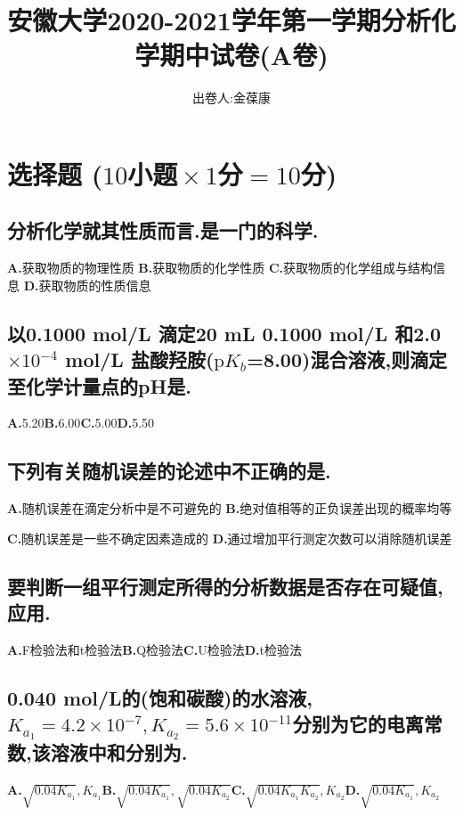 \documentclass[UTF8]{article}
\title{安徽大学2020-2021学年第一学期分析化学期中试卷(A卷)}
\author{出卷人:金葆康}
\date{}
\newcommand{\ptsMulti}[3]{ \small($#1\!\!$小题$\!\!\times #2\!\!$分$\!\!=\!\!#3\!\!$分)}
\newcommand{\p}{\mathrm{p}}
\newcommand{\shortline}{\underline{\hspace{1cm}}}
\newcommand{\bfA}{\textbf{A.}}
\newcommand{\bfB}{\qquad \textbf{B.}}
\newcommand{\bfC}{\qquad \textbf{C.}}
\newcommand{\bfD}{\qquad \textbf{D.}}
\newcommand{\ind}{\hspace{-1pt}}
\newcommand{\indLarge}{\hspace{-0.6cm}}
\begin{document}
    \maketitle
    \section{选择题\ptsMulti{10}{1}{10}}

    \subsection{分析化学就其性质而言.是一门\shortline\ind 的科学.}
        \indLarge \bfA 获取物质的物理性质
        \indLarge \bfB 获取物质的化学性质
        \indLarge \bfC 获取物质的化学组成与结构信息
        \indLarge \bfD 获取物质的性质信息

    \subsection{以0.1000 mol/L 滴定20 mL 0.1000 mol/L 和2.0$\times 10^{-4}$ mol/L 盐酸羟胺($\p K_b$=8.00)混合溶液,则滴定至化学计量点的pH是\shortline.}
    
    \bfA 5.20\bfB 6.00\bfC 5.00\bfD 5.50
    \subsection{下列有关随机误差的论述中不正确的是\shortline.}
        \qquad \bfA 随机误差在滴定分析中是不可避免的
        \bfB 绝对值相等的正负误差出现的概率均等
        \par \bfC 随机误差是一些不确定因素造成的
        \quad \bfD 通过增加平行测定次数可以消除随机误差

    \subsection{要判断一组平行测定所得的分析数据是否存在可疑值,应用\shortline.}
    \bfA F检验法和t检验法\bfB Q检验法\bfC U检验法\bfD t检验法

    \subsection{0.040 mol/L的(饱和碳酸)的水溶液,$K_{a_1}=4.2\times 10^{-7},K_{a_2}=5.6\times 10^{-11}$分别为它的电离常数,该溶液中\ce{[H+]}和\ce{[CO_3^{2-}]}分别为\shortline.}
    \bfA $\sqrt{0.04K_{a_1}},K_{a_1}$\bfB $\sqrt{0.04K_{a_1}},\sqrt{0.04K_{a_2}}$\bfC $\sqrt{0.04K_{a_1}K_{a_2}},K_{a_2}$\bfD $\sqrt{0.04K_{a_1}},K_{a_2}$
\end{document}
